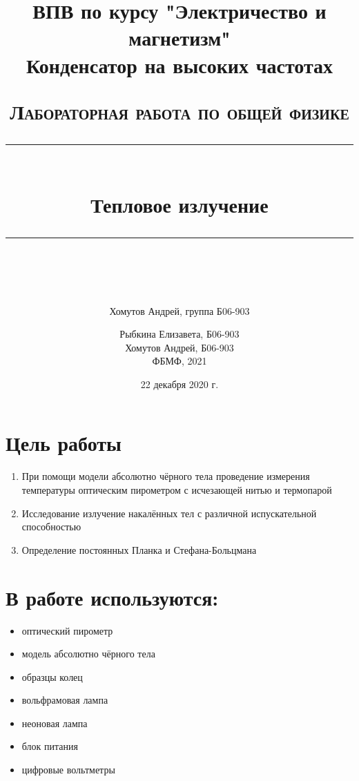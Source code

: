\documentclass[a4paper, 12pt]{article}
\author{Хомутов Андрей, группа Б06-903}
\title{ВПВ по курсу "Электричество и магнетизм" \\ Конденсатор на высоких частотах}
\date{22 декабря 2020 г.}
\newcommand{\HRule}[1]{\rule{\linewidth}{#1}}
\begin{document}
\title{ \normalsize \textsc{Лабораторная работа по общей физике}
		\\ [4.0cm]
		\HRule{0.5pt} \\ [0.3cm]
		\LARGE \textbf{{Тепловое излучение}}
		\HRule{0.5pt} \\ [0.1cm]
		\normalsize  \vspace*{18\baselineskip}}

\date{}

\author{Рыбкина Елизавета, Б06-903 \\
Хомутов Андрей, Б06-903 \\
ФБМФ, 2021\\ }

\maketitle
\thispagestyle{empty}
\newpage
\section*{Цель работы}
\begin{enumerate}
    \item При помощи модели абсолютно чёрного тела проведение измерения температуры оптическим пирометром с исчезающей нитью и термопарой
    \item Исследование излучение накалённых тел с различной испускательной способностью
    \item Определение постоянных Планка и Стефана-Больцмана
\end{enumerate}

\section*{В работе используются:}
\begin{itemize}
    \item оптический пирометр
    \item модель абсолютно чёрного тела
    \item образцы колец
    \item вольфрамовая лампа
    \item неоновая лампа
    \item блок питания
    \item цифровые вольтметры
\end{itemize}
\end{document}

